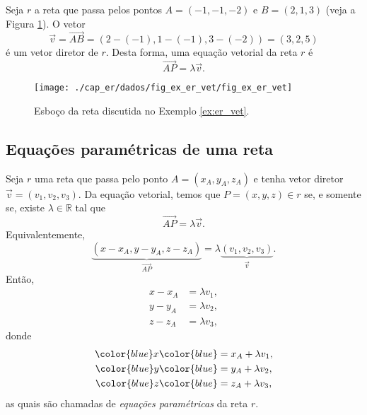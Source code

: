 \begin{ex}\label{ex:er_vet}
  Seja $r$ a reta que passa pelos pontos $A=(-1,-1,-2)$ e $B = (2,1,3)$ (veja a Figura \ref{fig:ex_er_vet}). O vetor
  \begin{equation}
    \vec{v} = \overrightarrow{AB} = (2-(-1),1-(-1),3-(-2)) = (3,2,5)
  \end{equation}
  é um vetor diretor de $r$. Desta forma, uma equação vetorial da reta $r$ é
  \begin{equation}
    \overrightarrow{AP} = \lambda\vec{v}.
  \end{equation}
  \begin{figure}[H]
    \centering
    \texttt{[image: ./cap\_er/dados/fig\_ex\_er\_vet/fig\_ex\_er\_vet]}
    \caption{Esboço da reta discutida no Exemplo \ref{ex:er_vet}.}
    \label{fig:ex_er_vet}
  \end{figure}  
\end{ex}

\subsection{Equações paramétricas de uma reta}

Seja $r$ uma reta que passa pelo ponto $A = (x_A,y_A,z_A)$ e tenha vetor diretor $\vec{v} = (v_1,v_2,v_3)$. Da equação vetorial, temos que $P = (x,y,z)\in r$ se, e somente se, existe $\lambda\in\mathbb{R}$ tal que
\begin{equation}
  \overrightarrow{AP} = \lambda\vec{v}.
\end{equation}
Equivalentemente,
\begin{equation}
  \underbrace{(x-x_A,y-y_A,z-z_A)}_{\overrightarrow{AP}} = \lambda \underbrace{(v_1,v_2,v_3)}_{\vec{v}}.
\end{equation}
Então,
\begin{align}
  x-x_A &= \lambda v_1,\\
  y-y_A &= \lambda v_2,\\
  z-z_A &= \lambda v_3,
\end{align}
donde
\begin{align}
  {\color{blue}x} &{\color{blue}= x_A + \lambda v_1},\\
  {\color{blue}y} &{\color{blue}= y_A + \lambda v_2},\\
  {\color{blue}z} &{\color{blue}= z_A + \lambda v_3},
\end{align}
as quais são chamadas de \emph{equações paramétricas} da reta $r$.

